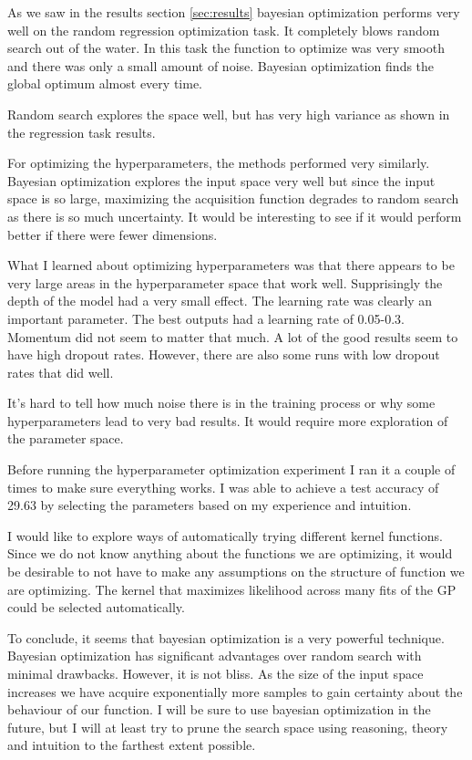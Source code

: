 
As we saw in the results section \ref{sec:results} bayesian optimization performs very well on the random regression optimization task. It completely blows random search out of the water. In this task the function to optimize was very smooth and there was only a small amount of noise. Bayesian optimization finds the global optimum almost every time.

Random search explores the space well, but has very high variance as shown in the regression task results.

For optimizing the hyperparameters, the methods performed very similarly. Bayesian optimization explores the input space very well but since the input space is so large, maximizing the acquisition function degrades to random search as there is so much uncertainty. It would be interesting to see if it would perform better if there were fewer dimensions.

What I learned about optimizing hyperparameters was that there appears to be very large areas in the hyperparameter space that work well. Supprisingly the depth of the model had a very small effect. The learning rate was clearly an important parameter. The best outputs had a learning rate of 0.05-0.3. Momentum did not seem to matter that much. A lot of the good results seem to have high dropout rates. However, there are also some runs with low dropout rates that did well.

It's hard to tell how much noise there is in the training process or why some hyperparameters lead to very bad results. It would require more exploration of the parameter space.

Before running the hyperparameter optimization experiment I ran it a couple of times to make sure everything works. I was able to achieve a test accuracy of 29.63 by selecting the parameters based on my experience and intuition.

I would like to explore ways of automatically trying different kernel functions. Since we do not know anything about the functions we are optimizing, it would be desirable to not have to make any assumptions on the structure of function we are optimizing. The kernel that maximizes likelihood across many fits of the GP could be selected automatically.

To conclude, it seems that bayesian optimization is a very powerful technique. Bayesian optimization has significant advantages over random search with minimal drawbacks. However, it is not bliss. As the size of the input space increases we have acquire exponentially more samples to gain certainty about the behaviour of our function. I will be sure to use bayesian optimization in the future, but I will at least try to prune the search space using reasoning, theory and intuition to the farthest extent possible.



